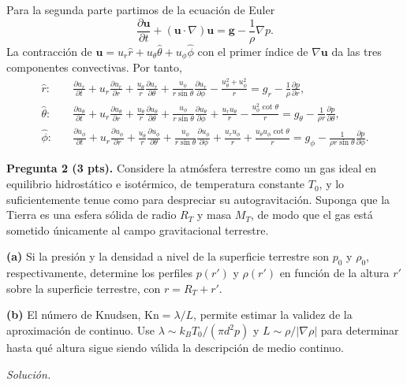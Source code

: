 \documentclass[12pt]{article}
\begin{document}
Para la segunda parte partimos de la ecuación de Euler
\begin{equation}
\frac{\partial\bm u}{\partial t}+(\bm u\cdot\nabla)\bm u
=\bm g-\frac1\rho\nabla p.
\end{equation}
La contracción de $\bm u=u_r\hat r+u_\theta\hat\theta+u_\phi\hat\phi$ con el primer índice de $\nabla\bm u$ da las tres componentes convectivas. Por tanto,
\begin{align}
\hat r:\quad
&\frac{\partial u_r}{\partial t}
+u_r\frac{\partial u_r}{\partial r}
+\frac{u_\theta}{r}\frac{\partial u_r}{\partial\theta}
+\frac{u_\phi}{r\sin\theta}\frac{\partial u_r}{\partial\phi}
-\frac{u_\theta^2+u_\phi^2}{r}
=g_r-\frac1\rho\frac{\partial p}{\partial r},\\
\hat\theta:\quad
&\frac{\partial u_\theta}{\partial t}
+u_r\frac{\partial u_\theta}{\partial r}
+\frac{u_\theta}{r}\frac{\partial u_\theta}{\partial\theta}
+\frac{u_\phi}{r\sin\theta}\frac{\partial u_\theta}{\partial\phi}
+\frac{u_ru_\theta}{r}-\frac{u_\phi^2\cot\theta}{r}
=g_\theta-\frac{1}{\rho r}\frac{\partial p}{\partial\theta},\\
\hat\phi:\quad
&\frac{\partial u_\phi}{\partial t}
+u_r\frac{\partial u_\phi}{\partial r}
+\frac{u_\theta}{r}\frac{\partial u_\phi}{\partial\theta}
+\frac{u_\phi}{r\sin\theta}\frac{\partial u_\phi}{\partial\phi}
+\frac{u_ru_\phi}{r}+\frac{u_\theta u_\phi\cot\theta}{r}
=g_\phi-\frac{1}{\rho r\sin\theta}\frac{\partial p}{\partial\phi}.
\end{align}

\textbf{Pregunta 2 (3 pts).} Considere la atmósfera terrestre como un gas ideal en equilibrio hidrostático e isotérmico, de temperatura constante $T_0$, y lo suficientemente tenue como para despreciar su autogravitación. Suponga que la Tierra es una esfera sólida de radio $R_T$ y masa $M_T$, de modo que el gas está sometido únicamente al campo gravitacional terrestre.

\textbf{(a)} Si la presión y la densidad a nivel de la superficie terrestre son $p_0$ y $\rho_0$, respectivamente, determine los perfiles $p(r')$ y $\rho(r')$ en función de la altura $r'$ sobre la superficie terrestre, con $r=R_T+r'$.

\textbf{(b)} El número de Knudsen, $\mathrm{Kn}=\lambda/L$, permite estimar la validez de la aproximación de continuo. Use $\lambda\sim k_BT_0/(\pi d^2p)$ y $L\sim\rho/|\nabla\rho|$ para determinar hasta qué altura sigue siendo válida la descripción de medio continuo.

\textit{Solución.}
\end{document}
